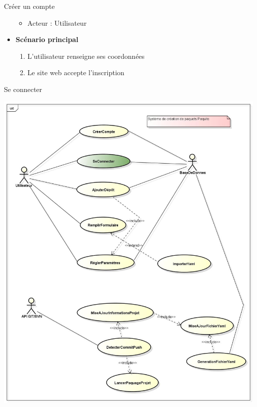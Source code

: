 \documentclass[9pt,xcolor=dvipsnames]{beamer}
\begin{document}
\begin{frame}{Créer un compte}
\begin{minipage}{0.5\textwidth}
\begin{flushright}
\begin{itemize}
\begin{itemize}
        \item[] Acteur : Utilisateur 
        \end{itemize} 
      \item \textbf{Scénario principal} 
        \begin{enumerate} 
        \item L'utilisateur renseigne ses coordonnées 
        \item Le site web accepte l'inscription 
        \end{enumerate}
      \end{itemize}
    \end{flushright}
  \end{minipage}
\end{frame}

\begin{frame}{Se connecter}
  \begin{minipage}{0.40\textwidth}
    \begin{flushleft}
      \includegraphics[scale=\largeur]{../img/Diagram_seConnecter.jpg}
    \end{flushleft}
  \end{minipage}

\end{frame}
\end{document}
